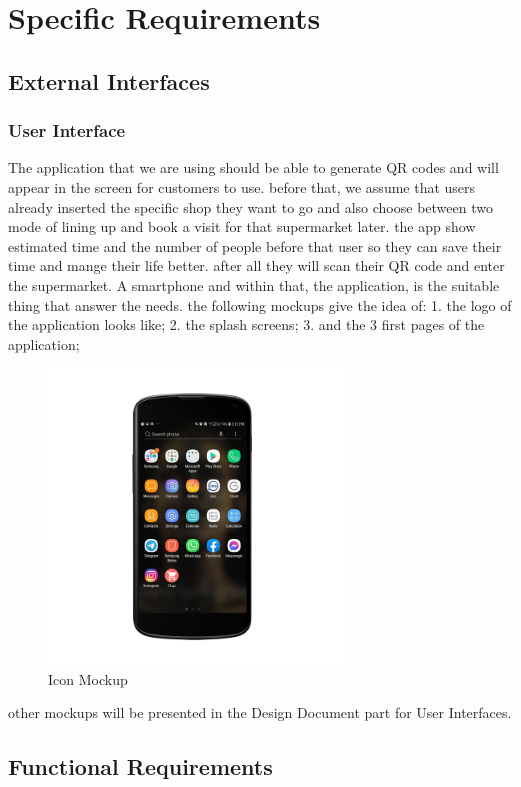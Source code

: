 \section{Specific Requirements}

\subsection{External Interfaces}
\subsubsection{User Interface}
% 
The application that we are using should be able to generate QR codes and will appear in the screen for customers to use. before that, we assume that users already inserted the specific shop they want to go and also choose between two mode of lining up and book a visit for that supermarket later. the app show  estimated time and the number of people before that user so they can save their time and  mange their life better. after all they will scan their QR code and enter the supermarket.
A smartphone and within that, the application, is the suitable thing that answer the needs.
the following mockups give the idea of:
1. the logo of the application looks like;
2. the splash screens;
3. and the 3 first pages of the application;
\begin{figure}[H]
  \centering
  \includegraphics[width=0.7\textwidth,keepaspectratio]{images/1.jpg}
  \caption{Icon Mockup}
\end{figure}
other mockups will be presented in the Design Document part for User Interfaces.
\subsection{Functional Requirements}



